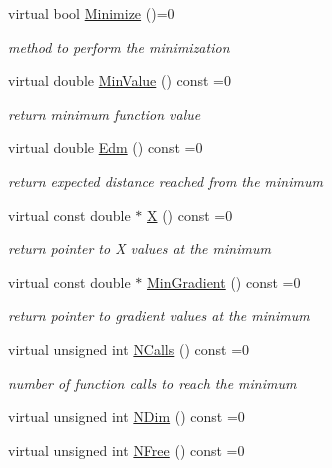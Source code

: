 \begin{DoxyCompactItemize}
virtual bool \mbox{\hyperlink{classROOT_1_1Math_1_1Minimizer_a5f6a6307935a17fb13dac1ee7f1c41fd}{Minimize}} ()=0
\begin{DoxyCompactList}\small\item\em method to perform the minimization \end{DoxyCompactList}\item 
virtual double \mbox{\hyperlink{classROOT_1_1Math_1_1Minimizer_ae4845ff42bc0e244fdfa068c53b9a965}{Min\+Value}} () const =0
\begin{DoxyCompactList}\small\item\em return minimum function value \end{DoxyCompactList}\item 
virtual double \mbox{\hyperlink{classROOT_1_1Math_1_1Minimizer_a990c6935849a3fb31aedab1df6c26f28}{Edm}} () const =0
\begin{DoxyCompactList}\small\item\em return expected distance reached from the minimum \end{DoxyCompactList}\item 
virtual const double $\ast$ \mbox{\hyperlink{classROOT_1_1Math_1_1Minimizer_a35c7c2caf54e548f892d84795209edad}{X}} () const =0
\begin{DoxyCompactList}\small\item\em return pointer to X values at the minimum \end{DoxyCompactList}\item 
virtual const double $\ast$ \mbox{\hyperlink{classROOT_1_1Math_1_1Minimizer_a861036d38a21d9a60d44e068397307af}{Min\+Gradient}} () const =0
\begin{DoxyCompactList}\small\item\em return pointer to gradient values at the minimum \end{DoxyCompactList}\item 
virtual unsigned int \mbox{\hyperlink{classROOT_1_1Math_1_1Minimizer_abf8b2e97d47843a1fde7a54cb51c1f0e}{N\+Calls}} () const =0
\begin{DoxyCompactList}\small\item\em number of function calls to reach the minimum \end{DoxyCompactList}\item 
virtual unsigned int \mbox{\hyperlink{classROOT_1_1Math_1_1Minimizer_aecb9b9ee5c6a9fd7db3196ae3ac5e335}{N\+Dim}} () const =0
\item 
virtual unsigned int \mbox{\hyperlink{classROOT_1_1Math_1_1Minimizer_a75a7cd8dc0d764ecc9d82dd8f83aab24}{N\+Free}} () const =0

\end{DoxyCompactItemize}
